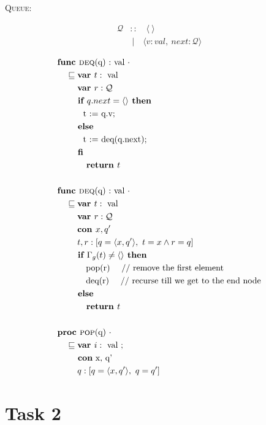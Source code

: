 \documentclass[a4paper]{scrartcl}
\newcommand{\refinedby}{\sqsubseteq} %
\begin{document}
\begin{center}
{\LARGE{\textsc{Queue:}}\normalsize}
\end{center}
\begin{align*}
\mathcal{Q} &:: \quad \langle ~ \rangle \\
&~| \quad \langle v : val,~\mathit{next} : \mathcal{Q} \rangle \\
\end{align*}
\begin{align*}
& \textbf{func }\text{\textsc{deq}(q) :} \text{ val } \cdot \\
    & \quad \refinedby \textbf{var }t : \text{ val} \\
    & \quad \quad ~ \textbf{var } r : \mathcal{Q}  \\
    & \quad \quad \textbf{ if } q.next = \langle \rangle \textbf{ then} \\
	& \quad \quad \quad \text{t := q.v;} \\
    & \quad \quad \textbf{ else} \\
	& \quad \quad \quad \text{t := deq(q.next);} \\
    & \quad \quad \textbf{ fi} \\
    & \quad \quad \quad \textbf{ return } t \\\\
%
& \textbf{func }\text{\textsc{deq}(q) :} \text{ val } \cdot \\
    & \quad \refinedby \textbf{var }t : \text{ val} \\
    & \quad \quad ~ \textbf{var } r : \mathcal{Q}  \\
    & \quad \quad ~ \textbf{con }x, q'  \\
    & \quad \quad ~t, r : [q = \langle x, q' \rangle, ~ t = x \land r = q]\\
    & \quad \quad \textbf{ if } \Gamma_g(t) \neq \langle \rangle \textbf{ then} \\
    & \quad \quad \quad \text{ pop(r)    \quad // remove the first element} \\
    & \quad \quad \quad \text{ deq(r)    \quad  // recurse till we get to the end node} \\
    & \quad \quad \textbf{ else} \\
    & \quad \quad \quad \textbf{ return } t \\\\
& \textbf{proc }\text{\textsc{pop}(q) } \cdot \\
	& \quad \refinedby \textbf{var }i : \text{ val ; } \\
	& \quad \quad \textbf{ con}\text{ x, q'} \\
	& \quad \quad~ q : [q = \langle x, q' \rangle, ~ q = q'] \\
\end{align*}

\section*{Task 2}
\end{document}
